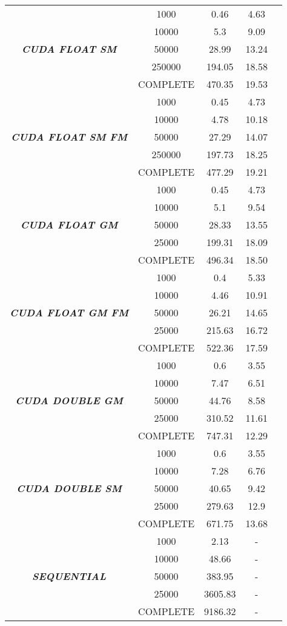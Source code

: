 {\begin{center}
\begin{longtable}{|c|c|c|c|c|}
     \multirow{5}{*}{\textbf{\textit{CUDA FLOAT SM}}}
     	 &1000&0.46 &4.63\\
	     &10000&5.3 &9.09\\
	     &50000&28.99 &13.24\\
	     &250000&194.05 &18.58\\
	     &COMPLETE&470.35 &19.53\\ \hline\hline
	     \multirow{5}{*}{\textbf{\textit{CUDA FLOAT SM FM}}}
	     &1000&0.45 &4.73\\
	     &10000&4.78 &10.18\\
	     &50000&27.29 &14.07\\
	     &250000&197.73 &18.25\\
	     &COMPLETE&477.29 &19.21\\ \hline\hline
	     \multirow{5}{*}{\textbf{\textit{CUDA FLOAT GM}}}
	     &1000&0.45 &4.73\\
	     &10000&5.1 &9.54\\
	     &50000&28.33 &13.55\\
	     &25000&199.31 &18.09\\ 
	     &COMPLETE&496.34 &18.50\\ \hline\hline
	     
	     \multirow{5}{*}{\textbf{\textit{CUDA FLOAT GM FM}}}
	     &1000&0.4 &5.33\\
	     &10000&4.46 &10.91\\
	     &50000&26.21 &14.65\\
	     &25000&215.63 &16.72\\ 
	     &COMPLETE&522.36 &17.59\\ \hline\hline
	     
	     
	     
	     \multirow{5}{*}{\textbf{\textit{CUDA DOUBLE GM}}}
	     &1000&0.6 &3.55\\
	     &10000&7.47 &6.51\\
	     &50000&44.76 &8.58\\
	     &25000&310.52 &11.61\\ 
	     &COMPLETE&747.31&12.29\\ \hline\hline
	     
	     
	     \multirow{5}{*}{\textbf{\textit{CUDA DOUBLE SM}}}
	     &1000&0.6 &3.55\\
	     &10000&7.28 &6.76\\
	     &50000&40.65 &9.42\\
	     &25000&279.63 &12.9\\ 
	     &COMPLETE&671.75&13.68\\ \hline
	     \multirow{5}{*}{\textbf{\textit{SEQUENTIAL}}}
	     &1000&2.13 &-\\
	     &10000&48.66 &-\\
	     &50000&383.95 &-\\
	     &25000&3605.83 &-\\ 
	     &COMPLETE&9186.32&-\\ \hline\hline
	     

\end{longtable}
\end{center}}
